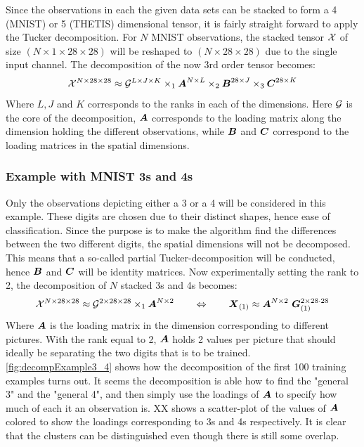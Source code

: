 Since the observations in each the given data sets can be stacked to form a 4 (MNIST) or 5 (THETIS) dimensional tensor, it is fairly straight forward to apply the Tucker decomposition. For $N$ MNIST observations, the stacked tensor $\mathcal{X}$ of size $(N \times 1 \times 28 \times 28)$ will be reshaped to $(N\times 28 \times 28)$ due to the single input channel. The decomposition of the now 3rd order tensor becomes:
\begin{equation}
    \mathcal{X}^{N\times 28 \times 28} \approx \mathcal{G}^{L\times J \times K} \times_1 \boldsymbol{A}^{N\times L} \times_2 \boldsymbol{B}^{28 \times J} \times_3 \boldsymbol{C}^{28 \times K}
\end{equation}
Where $L, J$ and $K$ corresponds to the ranks in each of the dimensions. Here $\mathcal{G}$ is the core of the decomposition, $\boldsymbol{A}$ corresponds to the loading matrix along the dimension holding the different observations, while $\boldsymbol{B}$ and $\boldsymbol{C}$ correspond to the loading matrices in the spatial dimensions.

\subsubsection{Example with MNIST 3s and 4s}
Only the observations depicting either a 3 or a 4 will be considered in this example. These digits are chosen due to their distinct shapes, hence ease of classification. Since the purpose is to make the algorithm find the differences between the two different digits, the spatial dimensions will not be decomposed. This means that a so-called partial Tucker-decomposition will be conducted, hence $\boldsymbol{B}$ and $\boldsymbol{C}$ will be identity matrices. Now experimentally setting the rank to 2, the decomposition of $N$ stacked 3s and 4s becomes:
\begin{equation}
    \tensor{X}^{N\times 28\times 28} \approx \tensor{G}^{2 \times 28 \times 28} \times_1 \bs{A}^{N\times 2} \qquad \Leftrightarrow \qquad \bs{X}_{(1)} \approx \bs{A}^{N\times 2} \ \bs{G}^{2 \times 28\cdot 28}_{(1)}
\end{equation}
Where $\boldsymbol{A}$ is the loading matrix in the dimension corresponding to different pictures. With the rank equal to 2, $\boldsymbol{A}$ holds 2 values per picture that should ideally be separating the two digits that is to be trained. \autoref{fig:decompExample3_4} shows how the decomposition of the first 100 training examples turns out. It seems the decomposition is able how to find the "general 3" and the "general 4", and then simply use the loadings of $\boldsymbol{A}$ to specify how much of each it an observation is. XX shows a scatter-plot of the values of $\boldsymbol{A}$ colored to show the loadings corresponding to 3s and 4s respectively. It is clear that the clusters can be distinguished even though there is still some overlap. 

